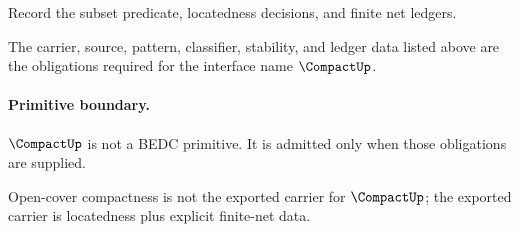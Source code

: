 \begin{definition}
\label{def:compact-ledger-policy}
Record the subset predicate, locatedness decisions, and finite net ledgers.
\end{definition}

\begin{definition}
\label{def:compact-certificate-obligations}
The carrier, source, pattern, classifier, stability, and ledger data listed above are the obligations required for the interface name \(\CompactUp\).
\end{definition}

\paragraph{Primitive boundary.}
\(\CompactUp\) is not a BEDC primitive. It is admitted only when those obligations are supplied.

\begin{remark}
\label{rem:compact-zero-axiom-note}
Open-cover compactness is not the exported carrier for \(\CompactUp\); the exported carrier is locatedness plus explicit finite-net data.
\end{remark}
